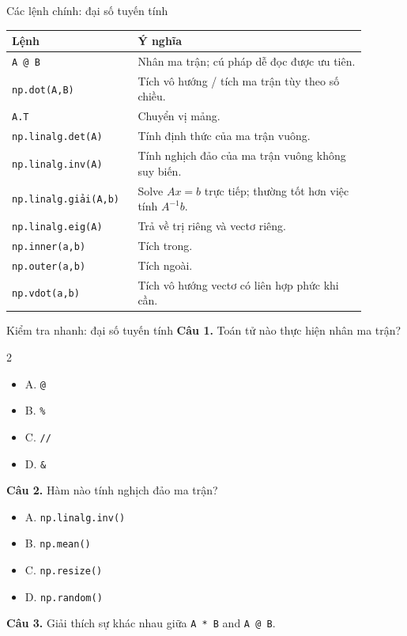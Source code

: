 \documentclass[aspectratio=169,11pt]{beamer}
\newcommand{\quiztitle}[1]{\textbf{\textcolor{QuizOrange}{#1}}}
\begin{document}
\begin{frame}{Các lệnh chính: đại số tuyến tính}
\scriptsize
\begin{tabular}{p{0.29\linewidth}p{0.60\linewidth}}
\toprule
\textbf{Lệnh} & \textbf{Ý nghĩa} \\
\midrule
\texttt{A @ B} & Nhân ma trận; cú pháp dễ đọc được ưu tiên. \\
\texttt{np.dot(A,B)} & Tích vô hướng / tích ma trận tùy theo số chiều. \\
\texttt{A.T} & Chuyển vị mảng. \\
\texttt{np.linalg.det(A)} & Tính định thức của ma trận vuông. \\
\texttt{np.linalg.inv(A)} & Tính nghịch đảo của ma trận vuông không suy biến. \\
\texttt{np.linalg.giải(A,b)} & Solve \(Ax=b\) trực tiếp; thường tốt hơn việc tính \(A^{-1}b\). \\
\texttt{np.linalg.eig(A)} & Trả về trị riêng và vectơ riêng. \\
\texttt{np.inner(a,b)} & Tích trong. \\
\texttt{np.outer(a,b)} & Tích ngoài. \\
\texttt{np.vdot(a,b)} & Tích vô hướng vectơ có liên hợp phức khi cần. \\
\bottomrule
\end{tabular}
\end{frame}

\begin{frame}{Kiểm tra nhanh: đại số tuyến tính}
\small
\quiztitle{Câu 1.} Toán tử nào thực hiện nhân ma trận?
\begin{multicols}{2}
\begin{itemize}
  \item A. \texttt{@}
  \item B. \texttt{\%}
  \item C. \texttt{//}
  \item D. \texttt{\&}
\end{itemize}
\end{multicols}
\quiztitle{Câu 2.} Hàm nào tính nghịch đảo ma trận?
\begin{itemize}
  \item A. \texttt{np.linalg.inv()}
  \item B. \texttt{np.mean()}
  \item C. \texttt{np.resize()}
  \item D. \texttt{np.random()}
\end{itemize}
\quiztitle{Câu 3.} Giải thích sự khác nhau giữa \texttt{A * B} and \texttt{A @ B}.
\end{frame}
\end{document}
